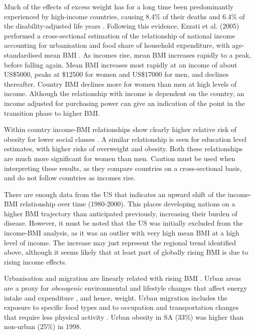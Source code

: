 \documentclass[12pt,a4paper]{article}
\begin{document}
Much of the effects of excess weight has for a long time been predominantly experienced by high-income countries, causing 8.4\% of their deaths and 6.4\% of the disability-adjusted life years \citep{ezzati02}. Following this evidence, Ezzati et al. (2005) performed a cross-sectional estimation of the relationship of national income accounting for urbanisation and food share of household expenditure, with age-standardised mean BMI \citep{ezzati05}. As incomes rise, mean BMI increases rapidly to a peak, before falling again. Mean BMI increases most rapidly at an income of about US\$5000, peaks at \$12500 for women and US\$17000 for men, and declines thereafter. Country BMI declines more for women than men at high levels of income. Although the relationship with income is dependent on the country, an income adjusted for purchasing power can give an indication of the point in the transition phase to higher BMI.  

Within country income-BMI relationships show clearly higher relative risk of obesity for lower social classes \citep{oecd}. A similar relationship is seen for education level estimates, with higher risks of overweight and obesity. Both these relationships are much more significant for women than men. Caution must be used when interpreting these results, as they compare countries on a cross-sectional basis, and do not follow countries as incomes rise. 

There are enough data from the US \citep{ezzati05} that indicates an upward shift of the income-BMI relationship over time (1980-2000). This places developing nations on a higher BMI trajectory than anticipated previously, increasing their burden of disease. However, it must be noted that the US was initially excluded from the income-BMI analysis, as it was an outlier with very high mean BMI at a high level of income. The increase may just represent the regional trend identified above, although it seems likely that at least part of globally rising BMI is due to rising income effects.  

Urbanisation and migration are linearly related with rising BMI \citep{ezzati05}. Urban areas are a proxy for \textit{obesogenic} environmental and lifestyle changes that affect energy intake and expenditure \citep{stevens11}, and hence, weight. Urban migration includes the exposure to specific food types and to occupation and transportation changes that require less physical activity \citep{kopelman2000}. Urban obesity in SA (33\%) was higher than non-urban (25\%) in 1998. 
\end{document}
